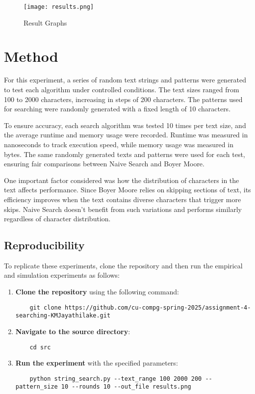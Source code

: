 \documentclass{article}
\begin{document}
\begin{figure}[H] 
    \centering
    \texttt{[image: results.png]}
    \caption{Result Graphs}
    \label{fig:results}
\end{figure}



\section{Method}

For this experiment, a series of random text strings and patterns were generated to test each algorithm under controlled conditions. The text sizes ranged from 100 to 2000 characters, increasing in steps of 200 characters. The patterns used for searching were randomly generated with a fixed length of 10 characters.

To ensure accuracy, each search algorithm was tested 10 times per text size, and the average runtime and memory usage were recorded. Runtime was measured in nanoseconds to track execution speed, while memory usage was measured in bytes. The same randomly generated texts and patterns were used for each test, ensuring fair comparisons between Naive Search and Boyer Moore.

One important factor considered was how the distribution of characters in the text affects performance. Since Boyer Moore relies on skipping sections of text, its efficiency improves when the text contains diverse characters that trigger more skips. Naive Search doesn't benefit from such variations and performs similarly regardless of character distribution.

\subsection{Reproducibility}

 To replicate these experiments, clone the repository and then run the empirical and simulation experiments as
 follows:

 \begin{enumerate}
    \item \textbf{Clone the repository} using the following command:
    \begin{verbatim}
    git clone https://github.com/cu-compg-spring-2025/assignment-4-searching-KMJayathilake.git
    \end{verbatim}

    \item \textbf{Navigate to the source directory}:
    \begin{verbatim}
    cd src
    \end{verbatim}

    \item \textbf{Run the experiment} with the specified parameters:
    \begin{verbatim}
    python string_search.py --text_range 100 2000 200 --pattern_size 10 --rounds 10 --out_file results.png

    \end{verbatim}
\end{enumerate}
\end{document}
